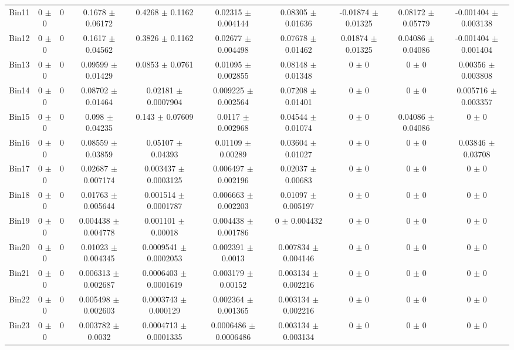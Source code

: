 \begin{tabular}{@{\extracolsep{4pt}}lccccccccc@{}}
     Bin11 & 0 $\pm$ 0 & 0 & 0.1678 $\pm$ 0.06172 & 0.4268 $\pm$ 0.1162 & 0.02315 $\pm$ 0.004144 & 0.08305 $\pm$ 0.01636 & -0.01874 $\pm$ 0.01325 & 0.08172 $\pm$ 0.05779 & -0.001404 $\pm$ 0.003138 \\ 
     Bin12 & 0 $\pm$ 0 & 0 & 0.1617 $\pm$ 0.04562 & 0.3826 $\pm$ 0.1162 & 0.02677 $\pm$ 0.004498 & 0.07678 $\pm$ 0.01462 & 0.01874 $\pm$ 0.01325 & 0.04086 $\pm$ 0.04086 & -0.001404 $\pm$ 0.001404 \\ 
     Bin13 & 0 $\pm$ 0 & 0 & 0.09599 $\pm$ 0.01429 & 0.0853 $\pm$ 0.0761 & 0.01095 $\pm$ 0.002855 & 0.08148 $\pm$ 0.01348 & 0 $\pm$ 0 & 0 $\pm$ 0 & 0.00356 $\pm$ 0.003808 \\ 
     Bin14 & 0 $\pm$ 0 & 0 & 0.08702 $\pm$ 0.01464 & 0.02181 $\pm$ 0.0007904 & 0.009225 $\pm$ 0.002564 & 0.07208 $\pm$ 0.01401 & 0 $\pm$ 0 & 0 $\pm$ 0 & 0.005716 $\pm$ 0.003357 \\ 
     Bin15 & 0 $\pm$ 0 & 0 & 0.098 $\pm$ 0.04235 & 0.143 $\pm$ 0.07609 & 0.0117 $\pm$ 0.002968 & 0.04544 $\pm$ 0.01074 & 0 $\pm$ 0 & 0.04086 $\pm$ 0.04086 & 0 $\pm$ 0 \\ 
     Bin16 & 0 $\pm$ 0 & 0 & 0.08559 $\pm$ 0.03859 & 0.05107 $\pm$ 0.04393 & 0.01109 $\pm$ 0.00289 & 0.03604 $\pm$ 0.01027 & 0 $\pm$ 0 & 0 $\pm$ 0 & 0.03846 $\pm$ 0.03708 \\ 
     Bin17 & 0 $\pm$ 0 & 0 & 0.02687 $\pm$ 0.007174 & 0.003437 $\pm$ 0.0003125 & 0.006497 $\pm$ 0.002196 & 0.02037 $\pm$ 0.00683 & 0 $\pm$ 0 & 0 $\pm$ 0 & 0 $\pm$ 0 \\ 
     Bin18 & 0 $\pm$ 0 & 0 & 0.01763 $\pm$ 0.005644 & 0.001514 $\pm$ 0.0001787 & 0.006663 $\pm$ 0.002203 & 0.01097 $\pm$ 0.005197 & 0 $\pm$ 0 & 0 $\pm$ 0 & 0 $\pm$ 0 \\ 
     Bin19 & 0 $\pm$ 0 & 0 & 0.004438 $\pm$ 0.004778 & 0.001101 $\pm$ 0.00018 & 0.004438 $\pm$ 0.001786 & 0 $\pm$ 0.004432 & 0 $\pm$ 0 & 0 $\pm$ 0 & 0 $\pm$ 0 \\ 
     Bin20 & 0 $\pm$ 0 & 0 & 0.01023 $\pm$ 0.004345 & 0.0009541 $\pm$ 0.0002053 & 0.002391 $\pm$ 0.0013 & 0.007834 $\pm$ 0.004146 & 0 $\pm$ 0 & 0 $\pm$ 0 & 0 $\pm$ 0 \\ 
     Bin21 & 0 $\pm$ 0 & 0 & 0.006313 $\pm$ 0.002687 & 0.0006403 $\pm$ 0.0001619 & 0.003179 $\pm$ 0.00152 & 0.003134 $\pm$ 0.002216 & 0 $\pm$ 0 & 0 $\pm$ 0 & 0 $\pm$ 0 \\ 
     Bin22 & 0 $\pm$ 0 & 0 & 0.005498 $\pm$ 0.002603 & 0.0003743 $\pm$ 0.000129 & 0.002364 $\pm$ 0.001365 & 0.003134 $\pm$ 0.002216 & 0 $\pm$ 0 & 0 $\pm$ 0 & 0 $\pm$ 0 \\ 
     Bin23 & 0 $\pm$ 0 & 0 & 0.003782 $\pm$ 0.0032 & 0.0004713 $\pm$ 0.0001335 & 0.0006486 $\pm$ 0.0006486 & 0.003134 $\pm$ 0.003134 & 0 $\pm$ 0 & 0 $\pm$ 0 & 0 $\pm$ 0 \\ 

\end{tabular}
